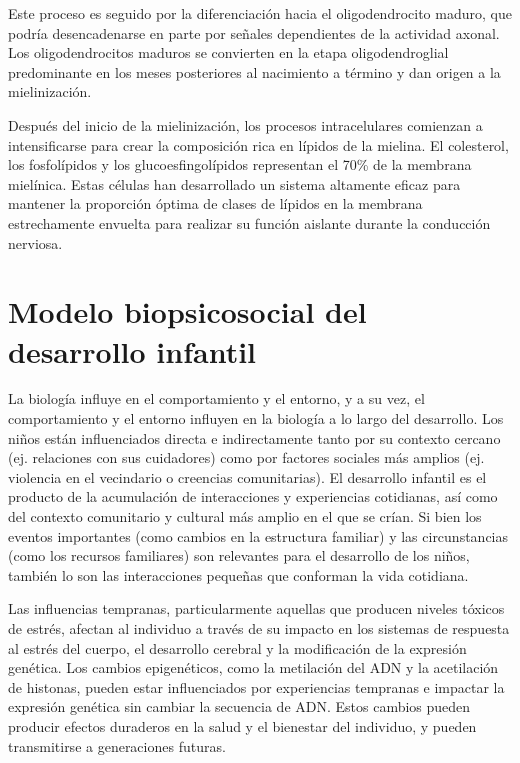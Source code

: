 \documentclass[11pt,letterpaper]{report}
\begin{document}
Este proceso es seguido por la diferenciación hacia el oligodendrocito maduro,
que podría desencadenarse en parte por señales dependientes de la actividad
axonal. Los oligodendrocitos maduros se convierten en la etapa oligodendroglial
predominante en los meses posteriores al nacimiento a término y dan origen a la
mielinización. \cite{Polin124}

Después del inicio de la mielinización, los procesos intracelulares comienzan a
intensificarse para crear la composición rica en lípidos de la mielina. El
colesterol, los fosfolípidos y los glucoesfingolípidos representan el 70\% de
la membrana mielínica. Estas células han desarrollado un sistema altamente
eficaz para mantener la proporción óptima de clases de lípidos en la membrana
estrechamente envuelta para realizar su función aislante durante la conducción
nerviosa. \cite{Polin124}

\section{Modelo biopsicosocial del desarrollo infantil}
La biología influye en el comportamiento y el entorno, y a su vez, el
comportamiento y el entorno influyen en la biología a lo largo del desarrollo.
Los niños están influenciados directa e indirectamente tanto por su contexto
cercano (ej. relaciones con sus cuidadores) como por factores sociales más
amplios (ej. violencia en el vecindario o creencias comunitarias). El
desarrollo infantil es el producto de la acumulación de interacciones y
experiencias cotidianas, así como del contexto comunitario y cultural más
amplio en el que se crían. Si bien los eventos importantes (como cambios en la
estructura familiar) y las circunstancias (como los recursos familiares) son
relevantes para el desarrollo de los niños, también lo son las interacciones
pequeñas que conforman la vida cotidiana. \cite{Feldman3}

Las influencias tempranas, particularmente aquellas que producen niveles
tóxicos de estrés, afectan al individuo a través de su impacto en los sistemas
de respuesta al estrés del cuerpo, el desarrollo cerebral y la modificación de
la expresión genética. Los cambios epigenéticos, como la metilación del ADN y
la acetilación de histonas, pueden estar influenciados por experiencias
tempranas e impactar la expresión genética sin cambiar la secuencia de ADN.
Estos cambios pueden producir efectos duraderos en la salud y el bienestar del
individuo, y pueden transmitirse a generaciones futuras. \cite{Nelson19}
\end{document}
